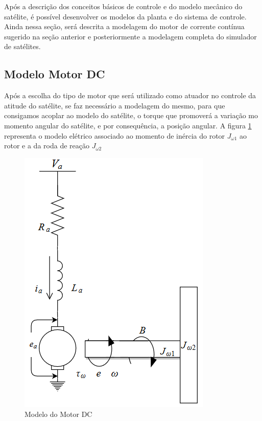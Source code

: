 Após a descrição dos conceitos básicos de controle e do modelo mecânico do satélite, é possível desenvolver os modelos da planta e do sistema de controle. Ainda nessa seção, será descrita a modelagem do motor de corrente contínua sugerido na seção anterior e posteriormente a modelagem completa do simulador de satélites.


\subsection{Modelo Motor DC}

Após a escolha do tipo de motor que será utilizado como atuador no controle da atitude do satélite, se faz necessário a modelagem do mesmo, para que consigamos acoplar ao modelo do satélite, o torque que promoverá a variação mo momento angular do satélite, e por consequência, a posição angular. A figura \ref{fig:modelo_motor_dc} representa o modelo elétrico associado ao momento de inércia do rotor $J_{\omega 1}$ ao rotor e a da roda de reação $J_{\omega 2}$

\begin{figure}[H]
  \caption{Modelo do Motor DC}
  \begin{center}
      \includegraphics[scale=.7]{metodologia/img/modelo_motor_dc}
  \end{center}
  \label{fig:modelo_motor_dc}
\end{figure}

